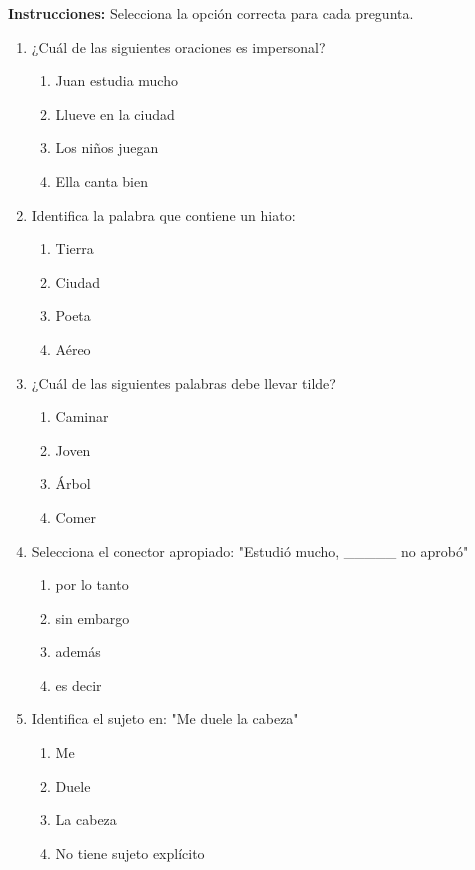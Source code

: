 \documentclass[12pt,spanish]{article}
\begin{document}
\textbf{Instrucciones:} Selecciona la opción correcta para cada pregunta.

\begin{enumerate}
    \item ¿Cuál de las siguientes oraciones es impersonal?
    \begin{enumerate}[label=\alph*)]
        \item Juan estudia mucho
        \item Llueve en la ciudad
        \item Los niños juegan
        \item Ella canta bien
    \end{enumerate}

    \item Identifica la palabra que contiene un hiato:
    \begin{enumerate}[label=\alph*)]
        \item Tierra
        \item Ciudad
        \item Poeta
        \item Aéreo
    \end{enumerate}

    \item ¿Cuál de las siguientes palabras debe llevar tilde?
    \begin{enumerate}[label=\alph*)]
        \item Caminar
        \item Joven
        \item Árbol
        \item Comer
    \end{enumerate}

    \item Selecciona el conector apropiado: "Estudió mucho, \_\_\_\_\_ no aprobó"
    \begin{enumerate}[label=\alph*)]
        \item por lo tanto
        \item sin embargo
        \item además
        \item es decir
    \end{enumerate}

    \item Identifica el sujeto en: "Me duele la cabeza"
    \begin{enumerate}[label=\alph*)]
        \item Me
        \item Duele
        \item La cabeza
        \item No tiene sujeto explícito
    \end{enumerate}
\end{enumerate}
\end{document}
